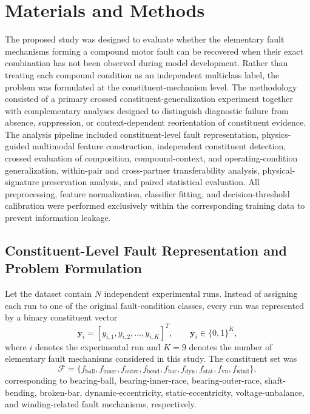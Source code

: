 \section{Materials and Methods}
\label{sec:methods}

The proposed study was designed to evaluate whether the elementary fault
mechanisms forming a compound motor fault can be recovered when their exact
combination has not been observed during model development. Rather than
treating each compound condition as an independent multiclass label, the
problem was formulated at the constituent-mechanism level. The methodology
consisted of a primary crossed constituent-generalization experiment
together with complementary analyses designed to distinguish diagnostic
failure from absence, suppression, or context-dependent reorientation of
constituent evidence. The analysis pipeline included constituent-level
fault representation, physics-guided multimodal feature construction,
independent constituent detection, crossed evaluation of composition,
compound-context, and operating-condition generalization, within-pair and
cross-partner transferability analysis, physical-signature preservation
analysis, and paired statistical evaluation. All preprocessing, feature
normalization, classifier fitting, and decision-threshold calibration were
performed exclusively within the corresponding training data to prevent
information leakage.

\subsection{Constituent-Level Fault Representation and Problem Formulation}
\label{sec:representation}

Let the dataset contain $N$ independent experimental runs. Instead of
assigning each run to one of the original fault-condition classes, every
run was represented by a binary constituent vector
\begin{equation}
\mathbf{y}_i = \left[y_{i,1}, y_{i,2}, \ldots, y_{i,K}\right]^{T},
\qquad \mathbf{y}_i \in \{0,1\}^{K},
\label{eq:convec}
\end{equation}
where $i$ denotes the experimental run and $K = 9$ denotes the number of
elementary fault mechanisms considered in this study. The constituent set
was
\begin{equation}
\mathcal{F} = \{f_{\mathrm{ball}}, f_{\mathrm{inner}}, f_{\mathrm{outer}},
f_{\mathrm{bend}}, f_{\mathrm{bar}}, f_{\mathrm{dyn}}, f_{\mathrm{stat}},
f_{\mathrm{vu}}, f_{\mathrm{wind}}\},
\label{eq:conset}
\end{equation}
corresponding to bearing-ball, bearing-inner-race, bearing-outer-race,
shaft-bending, broken-bar, dynamic-eccentricity, static-eccentricity,
voltage-unbalance, and winding-related fault mechanisms, respectively.


